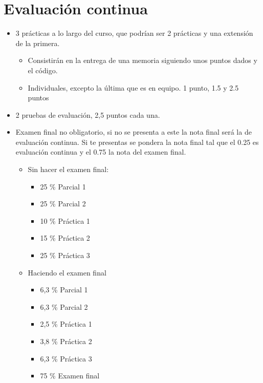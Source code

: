 \documentclass[12pt, twoside, openright]{report} %
\begin{document}
\section{Evaluación continua}
\begin{itemize}
	\item 3 prácticas a lo largo del curso, que podrían ser 2 prácticas y una extensión de la primera.
	      \begin{itemize}
		      \item Consistirán en la entrega de una memoria siguiendo unos puntos dados y el código.
		      \item Individuales, excepto la última que es en equipo. 1 punto, 1.5 y 2.5 puntos
	      \end{itemize}
	\item 2 pruebas de evaluación, 2,5 puntos cada una.
	\item Examen final no obligatorio, si no se presenta a este la nota final será la de evaluación continua. Si te presentas se pondera la nota final tal que el 0.25 es evaluación continua y el 0.75 la nota del examen final.
	      \begin{itemize}
		      \item Sin hacer el examen final:
		            \begin{itemize}
			            \item 25 \% Parcial 1
			            \item 25 \% Parcial 2
			            \item 10 \% Práctica 1
			            \item 15 \% Práctica 2
			            \item 25 \% Práctica 3
		            \end{itemize}
		      \item Haciendo el examen final
		            \begin{itemize}
			            \item 6,3 \% Parcial 1
			            \item 6,3 \% Parcial 2
			            \item 2,5 \% Práctica 1
			            \item 3,8 \% Práctica 2
			            \item 6,3 \% Práctica 3
			            \item 75 \% Examen final
		            \end{itemize}
	      \end{itemize}
\end{itemize}
\end{document}
